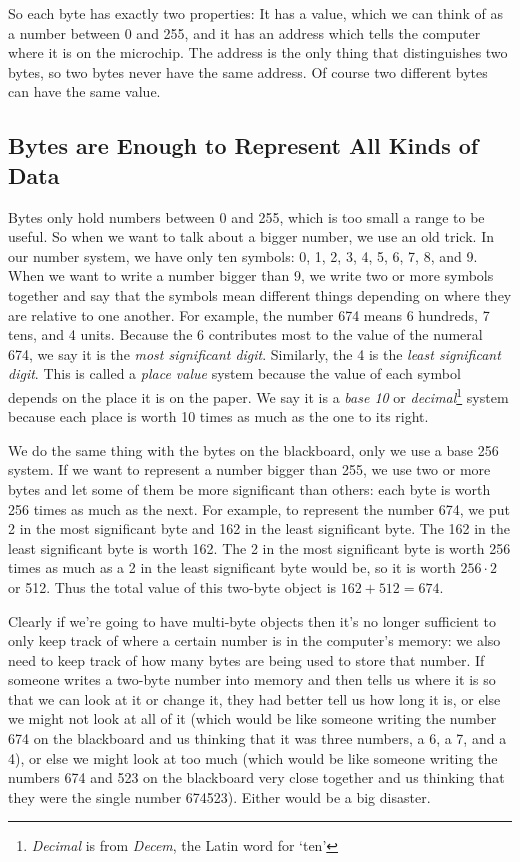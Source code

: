     So each byte has exactly two properties: It has a value, which we
can think of as a number between 0 and 255, and it has an address which
tells the computer where it is on the microchip.  The address is the
only thing that distinguishes two bytes, so two bytes never have the
same address.  Of course two different bytes can have the same value.


\subsection{Bytes are Enough to Represent All Kinds of Data}

    Bytes only hold numbers between 0 and 255, which is too small a
range to be useful.  So when we want to talk about a bigger number, we
use an old trick.  In our number system, we have only ten symbols: 0, 1,
2, 3, 4, 5, 6, 7, 8, and 9.  When we want to write a number bigger than
9, we write two or more symbols together and say that the symbols mean
different things depending on where they are relative to one another.
For example, the number 674 means 6 hundreds, 7 tens, and 4 units.
Because the 6 contributes most to the value of the numeral 674, we say
it is the {\em most significant digit}\/.  Similarly, the 4 is the {\em
least significant digit}\/.  This is called a {\em place value} system
because the value of each symbol depends on the place it is on the
paper.  We say it is a {\em base 10} or {\em decimal}\footnote{{\em
Decimal}\/ is from {\em Decem}\/, the Latin word for `ten'} system
because each place is worth 10 times as much as the one to its right.

    We do the same thing with the bytes on the blackboard, only we use a
base 256 system.  If we want to represent a number bigger than 255, we
use two or more bytes and let some of them be more significant than
others: each byte is worth 256 times as much as the next.  For example,
to represent the number 674, we put 2 in the most significant byte and
162 in the least significant byte.  The 162 in the least significant
byte is worth 162.  The 2 in the most significant byte is worth 256
times as much as a 2 in the least significant byte would be, so it is
worth $256\cdot 2$ or 512.  Thus the total value of this two-byte object
is $162+512 = 674$.

    Clearly if we're going to have multi-byte objects then it's no
longer sufficient to only keep track of where a certain number is in the
computer's memory: we also need to keep track of how many bytes are
being used to store that number.  If someone writes a two-byte number
into memory and then tells us where it is so that we can look at it or
change it, they had better tell us how long it is, or else we might not
look at all of it (which would be like someone writing the number 674 on
the blackboard and us thinking that it was three numbers, a 6, a 7, and
a 4), or else we might look at too much (which would be like someone
writing the numbers 674 and 523 on the blackboard very close together
and us thinking that they were the single number 674523).  Either would
be a big disaster.

